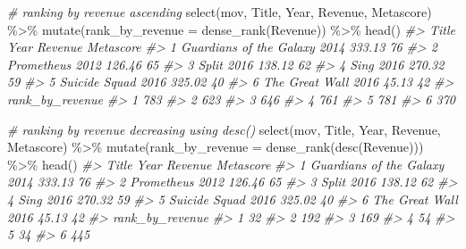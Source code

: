 \documentclass[
]{book}
\newenvironment{Shaded}{\begin{snugshade}}{\end{snugshade}}
\newcommand{\AttributeTok}[1]{\textcolor[rgb]{0.77,0.63,0.00}{#1}}
\newcommand{\CommentTok}[1]{\textcolor[rgb]{0.56,0.35,0.01}{\textit{#1}}}
\newcommand{\FunctionTok}[1]{\textcolor[rgb]{0.00,0.00,0.00}{#1}}
\newcommand{\NormalTok}[1]{#1}
\newcommand{\SpecialCharTok}[1]{\textcolor[rgb]{0.00,0.00,0.00}{#1}}
\begin{document}
\begin{Shaded}
\begin{Highlighting}[]
\CommentTok{\# ranking by revenue ascending}
\FunctionTok{select}\NormalTok{(mov, Title, Year, Revenue, Metascore) }\SpecialCharTok{\%\textgreater{}\%}
  \FunctionTok{mutate}\NormalTok{(}\AttributeTok{rank\_by\_revenue =} \FunctionTok{dense\_rank}\NormalTok{(Revenue)) }\SpecialCharTok{\%\textgreater{}\%}
  \FunctionTok{head}\NormalTok{()}
\CommentTok{\#\textgreater{}                     Title Year Revenue Metascore}
\CommentTok{\#\textgreater{} 1 Guardians of the Galaxy 2014  333.13        76}
\CommentTok{\#\textgreater{} 2              Prometheus 2012  126.46        65}
\CommentTok{\#\textgreater{} 3                   Split 2016  138.12        62}
\CommentTok{\#\textgreater{} 4                    Sing 2016  270.32        59}
\CommentTok{\#\textgreater{} 5           Suicide Squad 2016  325.02        40}
\CommentTok{\#\textgreater{} 6          The Great Wall 2016   45.13        42}
\CommentTok{\#\textgreater{}   rank\_by\_revenue}
\CommentTok{\#\textgreater{} 1             783}
\CommentTok{\#\textgreater{} 2             623}
\CommentTok{\#\textgreater{} 3             646}
\CommentTok{\#\textgreater{} 4             761}
\CommentTok{\#\textgreater{} 5             781}
\CommentTok{\#\textgreater{} 6             370}

\CommentTok{\# ranking by revenue decreasing using desc()}
\FunctionTok{select}\NormalTok{(mov, Title, Year, Revenue, Metascore) }\SpecialCharTok{\%\textgreater{}\%}
  \FunctionTok{mutate}\NormalTok{(}\AttributeTok{rank\_by\_revenue =} \FunctionTok{dense\_rank}\NormalTok{(}\FunctionTok{desc}\NormalTok{(Revenue))) }\SpecialCharTok{\%\textgreater{}\%}
  \FunctionTok{head}\NormalTok{()}
\CommentTok{\#\textgreater{}                     Title Year Revenue Metascore}
\CommentTok{\#\textgreater{} 1 Guardians of the Galaxy 2014  333.13        76}
\CommentTok{\#\textgreater{} 2              Prometheus 2012  126.46        65}
\CommentTok{\#\textgreater{} 3                   Split 2016  138.12        62}
\CommentTok{\#\textgreater{} 4                    Sing 2016  270.32        59}
\CommentTok{\#\textgreater{} 5           Suicide Squad 2016  325.02        40}
\CommentTok{\#\textgreater{} 6          The Great Wall 2016   45.13        42}
\CommentTok{\#\textgreater{}   rank\_by\_revenue}
\CommentTok{\#\textgreater{} 1              32}
\CommentTok{\#\textgreater{} 2             192}
\CommentTok{\#\textgreater{} 3             169}
\CommentTok{\#\textgreater{} 4              54}
\CommentTok{\#\textgreater{} 5              34}
\CommentTok{\#\textgreater{} 6             445}


\end{Highlighting}
\end{Shaded}
\end{document}
